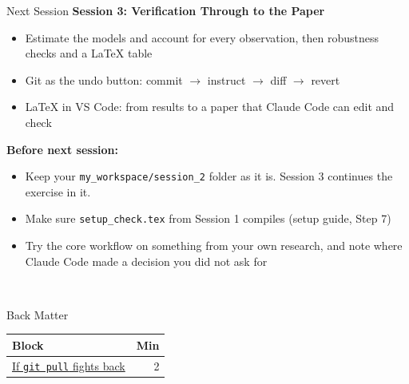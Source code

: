 \documentclass[aspectratio=169, 11pt]{beamer}
\begin{document}

\begin{frame}{Next Session}
  \textbf{Session 3: Verification Through to the Paper}

  \vspace{1em}
  \begin{itemize}
    \item Estimate the models and account for every observation, then robustness checks and a \LaTeX{} table
    \item Git as the undo button: commit $\rightarrow$ instruct $\rightarrow$ diff $\rightarrow$ revert
    \item \LaTeX{} in VS Code: from results to a paper that Claude Code can edit and check
  \end{itemize}

  \vspace{1em}
  \textbf{Before next session:}
  \begin{itemize}
    \item \alert{Keep your \texttt{my\_workspace/session\_2} folder as it is.} Session 3 continues the exercise in it.
    \item Make sure \texttt{setup\_check.tex} from Session 1 compiles (setup guide, Step 7)
    \item Try the core workflow on something from your own research, and note where Claude Code made a decision you did not ask for
  \end{itemize}
\end{frame}

\begin{frame}
  ~
\end{frame}


\appendix

\begin{frame}[label=backmatter]{Back Matter}
  \begin{tabular}{@{}lr@{}}
    \toprule
    \textbf{Block} & \textbf{Min} \\
    \midrule
    \hyperlink{gitpull}{If \texttt{git pull} fights back} & 2 \\
    \bottomrule
  \end{tabular}
\end{frame}
\end{document}
